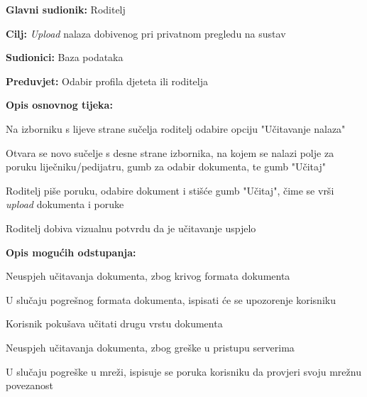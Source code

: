 					\noindent {}
					\begin{packed_item}
						
						\item \textbf{Glavni sudionik: }Roditelj
						\item  \textbf{Cilj:} \textit{Upload} nalaza dobivenog pri privatnom pregledu na sustav
						\item  \textbf{Sudionici:} Baza podataka
						\item  \textbf{Preduvjet:} Odabir profila djeteta ili roditelja
						\item  \textbf{Opis osnovnog tijeka:}
						
						\item[] \begin{packed_enum}
							
							\item Na izborniku s lijeve strane sučelja roditelj odabire opciju "Učitavanje nalaza"
							\item Otvara se novo sučelje s desne strane izbornika, na kojem se nalazi polje za poruku liječniku/pedijatru, gumb za odabir dokumenta, te gumb "Učitaj"
							\item Roditelj piše poruku, odabire dokument i stišće gumb "Učitaj", čime se vrši \textit{upload} dokumenta i poruke
							\item Roditelj dobiva vizualnu potvrdu da je učitavanje uspjelo
						\end{packed_enum}
						
						\item  \textbf{Opis mogućih odstupanja:}
						
						\item[] \begin{packed_item}
							\item[3.a] Neuspjeh učitavanja dokumenta, zbog krivog formata dokumenta
							\item[] \begin{packed_enum}
								\item U slučaju pogrešnog formata dokumenta, ispisati će se upozorenje korisniku
								\item Korisnik pokušava učitati drugu vrstu dokumenta
							\end{packed_enum}
							\item[3.b] Neuspjeh učitavanja dokumenta, zbog greške u pristupu serverima
							\item[] \begin{packed_enum}
								\item U slučaju pogreške u mreži, ispisuje se poruka korisniku da provjeri svoju mrežnu povezanost
							\end{packed_enum}
							
						\end{packed_item}
					\end{packed_item}
					
